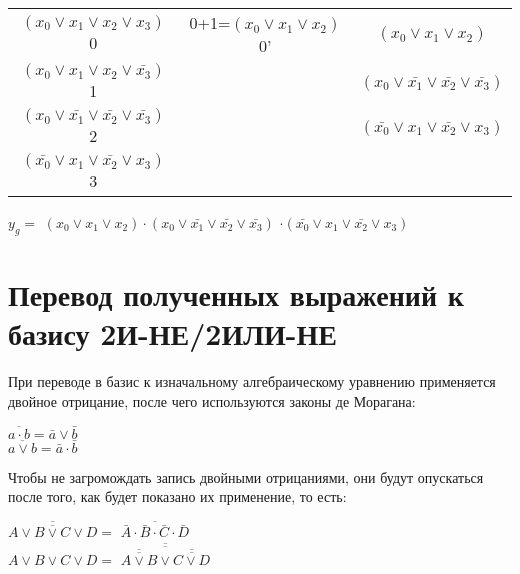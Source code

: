 \documentclass{bmstu}
\begin{document}
	\begin{center}
		\begin{tabular}{ |c|c|c| }
			\hline
$(x_0\vee x_1\vee x_2\vee x_3)$ 0				 &0+1=$(x_0\vee x_1\vee x_2)$ 0' &$(x_0 \vee x_1 \vee x_2 )$ 					\\
$(x_0\vee x_1\vee x_2\vee\bar{x_3})$ 1			 & 							     &$(x_0\vee\bar{x_1}\vee\bar{x_2}\vee\bar{x_3})$\\
$(x_0\vee\bar{x_1}\vee\bar{x_2}\vee\bar{x_3})$ 2 & 								 &$(\bar{x_0}\vee x_1\vee\bar{x_2}\vee x_3)$    \\
$(\bar{x_0}\vee x_1\vee\bar{x_2}\vee x_3)$ 3	 & 								 &   				   	    					\\
			\hline
		\end{tabular}
	\end{center}
	$y_g =$ $(x_0 \vee x_1 \vee x_2 ) \cdot $$(x_0\vee\bar{x_1}\vee\bar{x_2}\vee\bar{x_3})$ $\cdot(\bar{x_0}\vee x_1\vee\bar{x_2}\vee x_3)$

	\section{Перевод полученных выражений к базису 2И-НЕ/2ИЛИ-НЕ}
	При переводе в базис к изначальному алгебраическому уравнению применяется двойное отрицание, после чего используются законы де Морагана:
	
	\begin{center}
		$\overline{a \cdot b} = \bar{a} \vee \bar{b}$ \\
		$\overline{a \vee b} = \bar{a} \cdot \bar{b}$ \\
	\end{center}
	
	Чтобы не загромождать запись двойными отрицаниями, они будут опускаться после того, как будет показано их применение, то есть:
	
	\begin{center}
		$\overline{\overline{A \vee B \vee C \vee D}} =$
		$\overline{\bar{A} \cdot \bar{B} \cdot \bar{C} \cdot \bar{D}}$ \\
		$A \vee B \vee C \vee D =$
		$\overline{\overline{
				   \overline{\overline{A \vee B}} \vee
				   \overline{\overline{C \vee D}}
				}}$
	\end{center}

	\newpage
\end{document}

